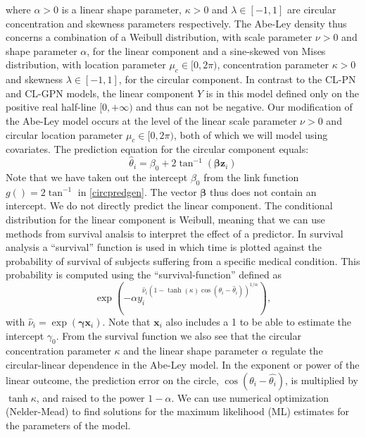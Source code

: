 \documentclass[man,mask]{apa6}
\begin{document}
\noindent where \(\alpha > 0\) is a linear shape parameter, \(\kappa > 0\) and
\(\lambda \in [-1, 1]\) are circular concentration and skewness parameters
respectively. The Abe-Ley density thus concerns a combination of a Weibull
distribution, with scale parameter \(\nu>0\) and shape parameter \(\alpha\), for
the linear component and a sine-skewed von Mises distribution, with location
parameter \(\mu_c\in [0, 2\pi)\), concentration parameter \(\kappa>0\) and
skewness \(\lambda \in [-1,1]\), for the circular component. In contrast to the
CL-PN and CL-GPN models, the linear component \(Y\) is in this model defined
only on the positive real half-line \([0, + \infty)\) and thus can not be
negative. Our modification of the Abe-Ley model occurs at the level of the
linear scale parameter \(\nu>0\) and circular location parameter \(\mu_c\in [0, 2\pi)\), both of which we will model using covariates.\newline
\indent The prediction equation for the circular component equals:
\begin{equation}\label{circpredcAL}
\hat{\theta}_i = \beta_0 + 2\tan^{-1}(\boldsymbol{\beta}\boldsymbol{z}_i)
\end{equation}
Note that we have taken out the intercept \(\beta_0\) from the link function \(g() = 2\tan^{-1}\) in \eqref{circpredgen}. The vector \(\boldsymbol{\beta}\) thus does
not contain an intercept. We do not directly predict the linear component. The
conditional distribution for the linear component is Weibull, meaning that we can
use methods from survival analsis to interpret the effect of a predictor. In
survival analysis a \enquote{survival} function is used in which time is plotted against
the probability of survival of subjects suffering from a specific medical
condition. This probability is computed using the \enquote{survival-function} defined as
\begin{equation}\label{survivalfunc}
\exp(-\alpha
y_i^{\hat{\nu}_i(1-\tanh(\kappa)\cos(\theta_i - \hat{\theta}_i))^{1/\alpha}}),
\end{equation}
\noindent with \(\hat{\nu}_i = \exp(\boldsymbol{\gamma}\boldsymbol{x}_i)\). Note that \(\boldsymbol{x}_i\) also includes a 1 to be able to estimate the intercept \(\gamma_0\). From
the survival function we also see that the circular concentration parameter
\(\kappa\) and the linear shape parameter \(\alpha\) regulate the
circular-linear dependence in the Abe-Ley model. In the exponent or power of the linear outcome, the prediction error on the circle, \(\cos(\theta_i - \hat{\theta_i})\), is multiplied by \(\tanh{\kappa}\), and raised to the power \(1-\alpha\).\newline
\indent We can use numerical optimization (Nelder-Mead) to find solutions for
the maximum likelihood (ML) estimates for the parameters of the model.
\end{document}
